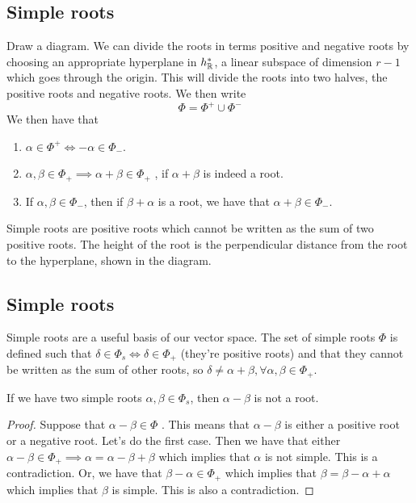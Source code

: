 \subsection{Simple roots}
Draw a diagram. 
We can divide the roots in terms positive and 
negative roots by choosing an 
appropriate hyperplane in $ h ^ * _{ \mathbb{R} } $, a linear 
subspace of dimension $ r - 1$ which 
goes through the origin. 
This will divide the roots into two halves, 
the positive roots and negative roots. 
We then write 
\[
\Phi = \Phi ^ + \cup \Phi ^ -
\] We then have that 
\begin{enumerate}
\item $ \alpha \in \Phi ^ +  \iff  - \alpha \in \Phi _ - $. 
\item $ \alpha , \beta \in \Phi _ +  \implies 
	\alpha + \beta \in \Phi _ + $ , 
	if $ \alpha +  \beta $ is indeed a root.
\item If $ \alpha , \beta \in \Phi _ - $, 
	then if  $ \beta + \alpha $ is a root, 
	we have that $ \alpha + \beta \in \Phi  _- $. 
\end{enumerate}
Simple roots are positive roots which cannot be written 
as the sum of two positive roots.
The height of the root is the perpendicular distance from the 
root to the hyperplane, shown in the diagram. 

\subsection{Simple roots} 
Simple roots are a useful basis of our vector space.
The set of simple roots $ \Phi $ is defined 
such that $ \delta \in \Phi_ s \iff \delta \in \Phi _ + $ (they're
positive roots)
and that they cannot be written as the sum of other roots, so 
$ \delta \neq \alpha + \beta , \forall \alpha, \beta \in \Phi _ + $. 
\begin{claim}
If we have two simple roots $ \alpha, \beta \in \Phi _ s $, 
then  $ \alpha - \beta $ is not a root. 
\begin{proof}
	Suppose that $ \alpha - \beta \in \Phi $ . This means 
	that $ \alpha - \beta $ is either a positive root 
	or a negative root. Let's do the first case. 
	Then we have that either $ \alpha - \beta \in  \Phi _ + \implies 
	\alpha = \alpha - \beta + \beta $ which implies that 
	$ \alpha $ is not simple. This is a contradiction. 
	Or, we have that $ \beta - \alpha \in \Phi_ + $ 
	which implies that $ \beta = \beta - \alpha + \alpha $ 
	which implies that $ \beta $ is simple. 
	This is also a contradiction. 
\end{proof}
\end{claim}

